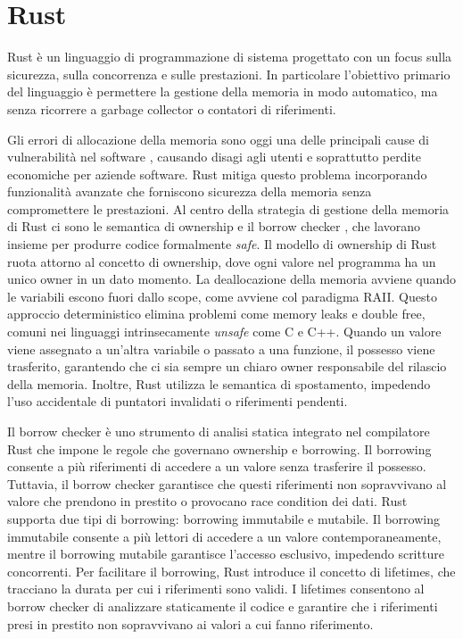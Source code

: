 \section[Rust]{Rust}

Rust è un linguaggio di programmazione di sistema progettato con un focus sulla sicurezza, sulla concorrenza e sulle prestazioni. In particolare l'obiettivo primario del linguaggio è permettere la gestione della memoria in modo automatico, ma senza ricorrere a garbage collector o contatori di riferimenti. 

Gli errori di allocazione della memoria sono oggi una delle principali cause di vulnerabilità nel software \cite[]{Mic:memory_safety}, causando disagi agli utenti e soprattutto perdite economiche per aziende software. Rust mitiga questo problema incorporando funzionalità avanzate che forniscono sicurezza della memoria senza compromettere le prestazioni. Al centro della strategia di gestione della memoria di Rust ci sono le semantica di ownership e il borrow checker \cite[]{Rust:borrow_checker}, che lavorano insieme per produrre codice formalmente \textit{safe}. Il modello di ownership di Rust ruota attorno al concetto di ownership, dove ogni valore nel programma ha un unico owner in un dato momento. La deallocazione della memoria avviene quando le variabili escono fuori dallo scope, come avviene col paradigma RAII. Questo approccio deterministico elimina problemi come memory leaks e double free, comuni nei linguaggi intrinsecamente \textit{unsafe} come C e C++. Quando un valore viene assegnato a un'altra variabile o passato a una funzione, il possesso viene trasferito, garantendo che ci sia sempre un chiaro owner responsabile del rilascio della memoria. Inoltre, Rust utilizza le semantica di spostamento, impedendo l'uso accidentale di puntatori invalidati o riferimenti pendenti.

Il borrow checker è uno strumento di analisi statica integrato nel compilatore Rust che impone le regole che governano ownership e borrowing. Il borrowing consente a più riferimenti di accedere a un valore senza trasferire il possesso. Tuttavia, il borrow checker garantisce che questi riferimenti non sopravvivano al valore che prendono in prestito o provocano race condition dei dati. Rust supporta due tipi di borrowing: borrowing immutabile e mutabile. Il borrowing immutabile consente a più lettori di accedere a un valore contemporaneamente, mentre il borrowing mutabile garantisce l'accesso esclusivo, impedendo scritture concorrenti. Per facilitare il borrowing, Rust introduce il concetto di lifetimes, che tracciano la durata per cui i riferimenti sono validi. I lifetimes consentono al borrow checker di analizzare staticamente il codice e garantire che i riferimenti presi in prestito non sopravvivano ai valori a cui fanno riferimento.

